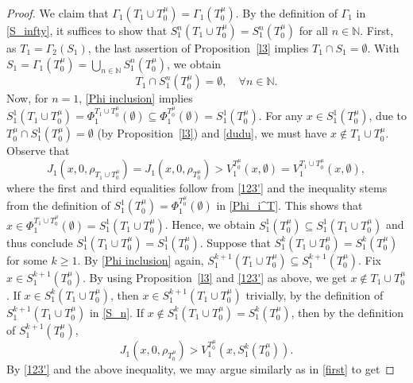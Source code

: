 \documentclass[11pt,reqno]{article}
\numberwithin{equation}{section}
\newcommand{\N}{\mathbb{N}}
\begin{document}
\begin{proof}
We claim that $\Gamma_1(T_1\cup T_0^\mu) = \Gamma_1(T_0^\mu)$. %
By the definition of $\Gamma_1$ in \eqref{S_infty}, it suffices to show that $S^n_1(T_1\cup T^\mu_0)= S^n_1(T^\mu_0)$ for all $n\in \N$. %
First, as $T_1 = \Gamma_2(S_1)$, the last assertion of Proposition~\ref{l3} implies $ T_1\cap S_1=\emptyset$. With $S_1=\Gamma_1(T^\mu_0) = \bigcup_{n\in\N} S_1^n(T^\mu_0)$, we obtain %
\begin{equation}\label{dudu}
T_1\cap S_1^n(T^\mu_0)=\emptyset,\quad \forall n\in\N. 
\end{equation}
Now, for $n=1$, \eqref{Phi inclusion} implies $S_1^1(T_1\cup T^\mu_0)= \Phi_1^{T_1\cup T^\mu_0}(\emptyset)\subseteq\Phi_1^{T^\mu_0}(\emptyset)=S_1^1(T^\mu_0)$. For any $x\in S_1^1(T^\mu_0)$, due to $T_0^\mu\cap S_1^1(T^\mu_0)=\emptyset$ (by Proposition~\ref{l3}) and \eqref{dudu}, we must have $x\notin T_1\cup T^\mu_0$. Observe that
\begin{equation}\label{first}
J_1(x,0,\rho_{T_1\cup T^\mu_0})= J_1(x,0,\rho_{T^\mu_0}) > V^{T^\mu_0}_1(x,\emptyset)=V^{T_1\cup T^\mu_0}_1(x,\emptyset), 
\end{equation}
where the first and third equalities follow from \eqref{123'} and the inequality stems from the definition of $S_1^1(T^\mu_0)=\Phi_1^{T^\mu_0}(\emptyset)$ in \eqref{Phi_i^T}. This shows that $x\in \Phi_1^{T_1\cup T^\mu_0}(\emptyset)=S_1^1(T_1\cup T^\mu_0)$. Hence, we obtain $S_1^1(T^\mu_0)\subseteq S_1^1(T_1\cup T^\mu_0)$ and thus conclude $S_1^1(T_1\cup T^\mu_0)=S_1^1(T^\mu_0)$. Suppose that $S_1^k(T_1\cup T^\mu_0)=S_1^k(T^\mu_0)$ for some $k\ge 1$. By \eqref{Phi inclusion} again, $S^{k+1}_1(T_1\cup T^\mu_0)\subseteq S^{k+1}_1(T^\mu_0)$. Fix $x\in S_1^{k+1}(T^\mu_0)$. By using Proposition~\ref{l3} and \eqref{123'} as above, we get $x\notin T_1\cup T^\mu_0$. If $x\in S_1^{k}(T_1\cup T^\mu_0)$, then $x\in S_1^{k+1}(T_1\cup T^\mu_0)$ trivially, by the definition of $S_1^{k+1}(T_1\cup T^\mu_0)$ in \eqref{S_n}. If $x\notin S_1^{k}(T_1\cup T^\mu_0)=S_1^k(T^\mu_0)$, then by the definition of $S_1^{k+1}(T^\mu_0)$,
\[
J_1(x,0,\rho_{T^\mu_0}) > V^{T^\mu_0}_1(x,S_1^k(T^\mu_0)). 
\]
By \eqref{123'} and the above inequality, we may argue similarly as in \eqref{first} to get

\end{proof}
\end{document}

